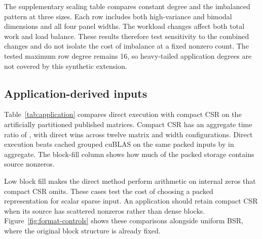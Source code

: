 \documentclass[10pt]{article}
\begin{document}
\begin{table}[!htbp]
\centering\small
\caption{Fixed-block BSR divided by direct execution on the uniform-32 subset.
Each width contains eight degree and locality configurations.}\label{tab:bsr}

\end{table}

The supplementary scaling table compares constant degree and the imbalanced pattern
at three sizes. Each row includes both high-variance and bimodal dimensions
and all four panel widths. The workload changes affect both total work and load balance. These results
therefore test sensitivity to the combined changes and do not isolate the
cost of imbalance at a fixed nonzero count.
The tested maximum row degree remains 16, so heavy-tailed application degrees
are not covered by this synthetic extension.



\subsection{Application-derived inputs}
Table~\ref{tab:application} compares direct execution with compact CSR on
the artificially partitioned published matrices. Compact CSR has an aggregate
time ratio of \AuditApplication{}, with \AuditApplicationWins{} direct
wins across twelve matrix and width configurations. Direct execution beats
cached grouped cuBLAS on the same packed inputs by \AuditApplicationGrouped{}
in aggregate. The block-fill column shows how much of the packed storage
contains source nonzeros.

\begin{table}[!htbp]
\centering\small
\caption{Compact-CSR lower-envelope time divided by packed direct time for
published matrices under the stated artificial partitions. A ratio below one
favors compact CSR. Each cell averages three process observations.}\label{tab:application}

\end{table}



Low block fill makes the direct method perform arithmetic on internal zeros
that compact CSR omits. These cases test the cost of choosing a packed
representation for scalar sparse input. An application should retain compact
CSR when its source has scattered nonzeros rather than dense blocks.
Figure~\ref{fig:format-controls} shows these comparisons alongside uniform
BSR, where the original block structure is already fixed.
\end{document}
